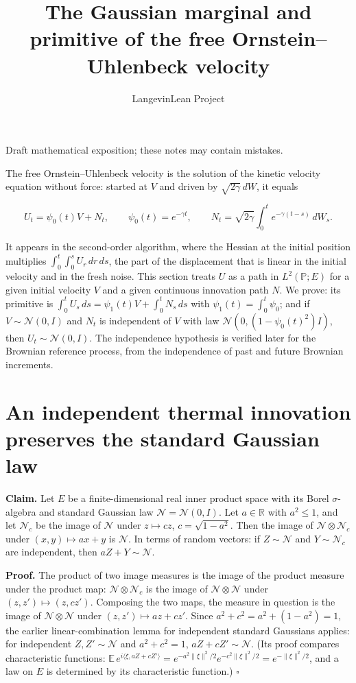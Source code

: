 \documentclass[11pt,a4paper]{article}
\title{\texorpdfstring{The Gaussian marginal and primitive of the free Ornstein–Uhlenbeck velocity}{The Gaussian marginal and primitive of the free Ornstein–Uhlenbeck velocity}}
\author{LangevinLean Project}
\date{}
\begin{document}
\maketitle
Draft mathematical exposition; these notes may contain mistakes.


The free Ornstein–Uhlenbeck velocity is the solution of the kinetic velocity equation without force: started at \(V\) and driven by \(\sqrt{2\gamma}\,dW\), it equals


\[U_t=\psi_0(t)V+N_t,\qquad\psi_0(t)=e^{-\gamma t},\qquad N_t=\sqrt{2\gamma}\int_0^te^{-\gamma(t-s)}\,dW_s.\]


It appears in the second-order algorithm, where the Hessian at the initial position multiplies \(\int_0^t\int_0^sU_r\,dr\,ds\), the part of the displacement that is linear in the initial velocity and in the fresh noise. This section treats \(U\) as a path in \(L^2(\mathbb P;E)\) for a given initial velocity \(V\) and a given continuous innovation path \(N\). We prove: its primitive is \(\int_0^tU_s\,ds=\psi_1(t)V+\int_0^tN_s\,ds\) with \(\psi_1(t)=\int_0^t\psi_0\); and if \(V\sim\mathcal N(0,I)\) and \(N_t\) is independent of \(V\) with law \(\mathcal N(0,(1-\psi_0(t)^2)I)\), then \(U_t\sim\mathcal N(0,I)\). The independence hypothesis is verified later for the Brownian reference process, from the independence of past and future Brownian increments.


\section{\texorpdfstring{An independent thermal innovation preserves the standard Gaussian law}{An independent thermal innovation preserves the standard Gaussian law}}


\textbf{Claim.} Let \(E\) be a finite-dimensional real inner product space with its Borel \(\sigma\)-algebra and standard Gaussian law \(\mathcal N=\mathcal N(0,I)\). Let \(a\in\mathbb R\) with \(a^2\le1\), and let \(\mathcal N_c\) be the image of \(\mathcal N\) under \(z\mapsto cz\), \(c=\sqrt{1-a^2}\). Then the image of \(\mathcal N\otimes\mathcal N_c\) under \((x,y)\mapsto ax+y\) is \(\mathcal N\). In terms of random vectors: if \(Z\sim\mathcal N\) and \(Y\sim\mathcal N_c\) are independent, then \(aZ+Y\sim\mathcal N\).




\textbf{Proof.} The product of two image measures is the image of the product measure under the product map: \(\mathcal N\otimes\mathcal N_c\) is the image of \(\mathcal N\otimes\mathcal N\) under \((z,z')\mapsto(z,cz')\). Composing the two maps, the measure in question is the image of \(\mathcal N\otimes\mathcal N\) under \((z,z')\mapsto az+cz'\). Since \(a^2+c^2=a^2+(1-a^2)=1\), the earlier linear-combination lemma for independent standard Gaussians applies: for independent \(Z,Z'\sim\mathcal N\) and \(a^2+c^2=1\), \(aZ+cZ'\sim\mathcal N\). (Its proof compares characteristic functions: \(\mathbb E\,e^{i\langle\xi,aZ+cZ'\rangle}=e^{-a^2\|\xi\|^2/2}e^{-c^2\|\xi\|^2/2}=e^{-\|\xi\|^2/2}\), and a law on \(E\) is determined by its characteristic function.) \(\square\)
\end{document}
